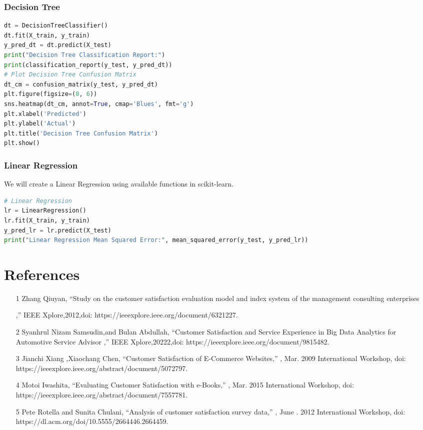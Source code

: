 \documentclass{article}
\begin{document}
\subsubsection{Decision Tree}
\begin{lstlisting}[language=Python]
dt = DecisionTreeClassifier()
dt.fit(X_train, y_train)
y_pred_dt = dt.predict(X_test)
print("Decision Tree Classification Report:")
print(classification_report(y_test, y_pred_dt))
# Plot Decision Tree Confusion Matrix
dt_cm = confusion_matrix(y_test, y_pred_dt)
plt.figure(figsize=(8, 6))
sns.heatmap(dt_cm, annot=True, cmap='Blues', fmt='g')
plt.xlabel('Predicted')
plt.ylabel('Actual')
plt.title('Decision Tree Confusion Matrix')
plt.show()
\end{lstlisting}







\subsubsection{Linear Regression }  We will create a Linear Regression using available functions in scikit-learn. 
\begin{lstlisting}[language=Python]
# Linear Regression
lr = LinearRegression()
lr.fit(X_train, y_train)
y_pred_lr = lr.predict(X_test)
print("Linear Regression Mean Squared Error:", mean_squared_error(y_test, y_pred_lr))
\end{lstlisting}


\section*{References}
\begin{itemize}
\item [1]Zhang Qiuyan, “Study on the customer satisfaction evaluation model and index system of the management consulting enterprises

,” IEEE Xplore,2012,doi: https://ieeexplore.ieee.org/document/6321227.
\item [2]Syanhrul Nizam Samsudin,and Bulan Abdullah, “Customer Satisfaction and Service Experience in Big Data Analytics for Automotive Service Advisor
,” IEEE Xplore,20222,doi: https://ieeexplore.ieee.org/document/9815482.

\item [3]Jianchi Xiang ,Xiaochang Chen, “Customer Satisfaction of E-Commerce Websites,” , Mar. 2009 International Workshop, doi: https://ieeexplore.ieee.org/abstract/document/5072797.
‌
\item [4]Motoi Iwashita, “Evaluating Customer Satisfaction with e-Books,” , Mar. 2015 International Workshop, doi: https://ieeexplore.ieee.org/abstract/document/7557781.
‌

\item [5]Pete Rotella and Sunita Chulani, “Analysis of customer satisfaction survey data,” , June . 2012 International Workshop, doi: https://dl.acm.org/doi/10.5555/2664446.2664459.
‌\end{itemize}
\end{document}
